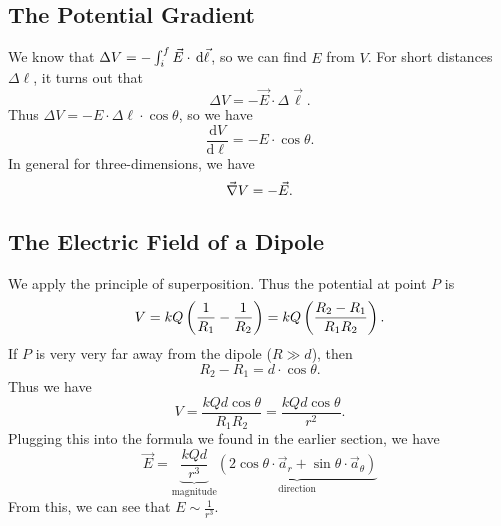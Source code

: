 \documentclass[class=article, crop=false]{standalone}
\begin{document}
  \subsection{The Potential Gradient}
  We know that $\Delta V = -\int_{i}^{f}\vec{E}\cdot  \,\mathrm{d}\vec{\ell}$, so we can find $E$ from $V$. For short distances $\Delta\ell$, it turns out that
  \[
    \Delta V = -\vec{E}\cdot \Delta\vec{\ell}.
  \]
  Thus $\Delta V = -E\cdot \Delta \ell\cdot \cos\theta$, so we have
  \[
    \boxed{\frac{\mathrm{d}V}{\mathrm{d}\ell} = -E\cdot \cos\theta.}
  \]
  In general for three-dimensions, we have
  \[
    \vec{\nabla}V = -\vec{E}.
  \]
  \subsection{The Electric Field of a Dipole}
  We apply the principle of superposition. Thus the potential at point $P$ is 
  \[
    V = kQ \left( \frac{1}{R_1}-\frac{1}{R_2} \right) = kQ \left( \frac{R_2-R_1}{R_1R_2} \right).
  \]
  If $P$ is very very far away from the dipole ($R \gg d$), then
  \[
    R_2 - R_1 = d\cdot \cos\theta.
  \]
  Thus we have
  \[
    V = \frac{kQd\cos\theta}{R_1R_2} = \frac{kQd\cos\theta}{r^2}.
  \]
  Plugging this into the formula we found in the earlier section, we have
  \[
    \vec{E} = \underbrace{\frac{kQd}{r^3}}_{\text{magnitude}}\underbrace{(2\cos\theta\cdot \vec{a}_r+\sin\theta\cdot \vec{a}_\theta)}_{\text{direction}}
  \]
  From this, we can see that $E\sim \frac{1}{r^3}$.
  \newpage
\end{document}

